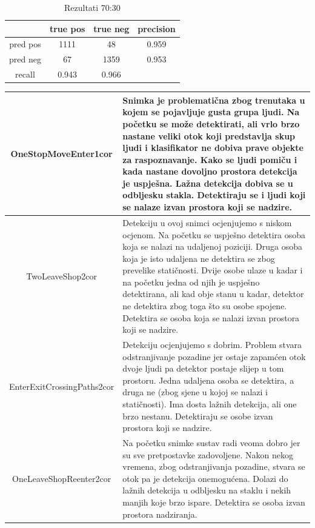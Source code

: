 \documentclass[utf8, seminar, numeric, times]{fer}
\begin{document}
\begin{table}
\begin{center}
\begin{tabular}{|c|c|c|c|}
\hline
 & true pos & true neg& precision\\ \hline
pred pos & 1111 & 48 &0.959\\ \hline
pred neg & 67 & 1359 &0.953\\ \hline
recall &0.943 & 0.966& \\ \hline
\end{tabular}
\end{center}
\caption{Rezultati 70:30}
\label{70}
\end{table}

\begin{table}
\begin{center}
\begin{tabular}{|c|p{10cm}|}
\hline
OneStopMoveEnter1cor & Snimka je problematična zbog trenutaka u kojem se pojavljuje gusta grupa ljudi. Na početku se može detektirati, ali vrlo brzo nastane veliki otok koji predstavlja skup ljudi i  klasifikator ne dobiva prave objekte za raspoznavanje. Kako se ljudi pomiču i kada nastane dovoljno prostora detekcija je uspješna. Lažna detekcija dobiva se u odbljesku stakla. Detektiraju se i ljudi koji se nalaze izvan prostora koji se nadzire. \\ \hline
TwoLeaveShop2cor & Detekciju u ovoj snimci ocjenjujemo s niskom ocjenom. Na početku se uspješno  detektira osoba koja se nalazi na udaljenoj poziciji. Druga osoba koja je isto udaljena ne detektira se zbog prevelike statičnosti. Dvije osobe ulaze u kadar i na početku jedna od njih je uspješno detektirana, ali kad obje stanu u kadar, detektor ne detektira zbog toga što su osobe spojene. Detektira se osoba koja se nalazi izvan prostora koji se nadzire. \\ \hline
EnterExitCrossingPaths2cor& Detekciju ocjenjujemo s dobrim. Problem stvara odstranjivanje pozadine jer ostaje zapamćen otok dvoje ljudi pa detektor postaje slijep u tom prostoru. Jedna udaljena osoba se detektira, a druga ne (zbog sjene u kojoj se nalazi i statičnosti). Ima dosta lažnih detekcija, ali one brzo nestanu. Detektiraju se osobe izvan prostora koji se nadzire. \\ \hline
OneLeaveShopReenter2cor & Na početku snimke sustav radi veoma dobro jer su sve pretpostavke zadovoljene. Nakon nekog vremena, zbog odstranjivanja pozadine, stvara se otok pa je detekcija onemogućena. Dolazi do lažnih detekcija u odbljesku na staklu i nekih manjih koje brzo ispare. Detektira se osoba izvan prostora nadziranja.\\ \hline

\end{tabular}
\end{center}
\end{table}
\end{document}
